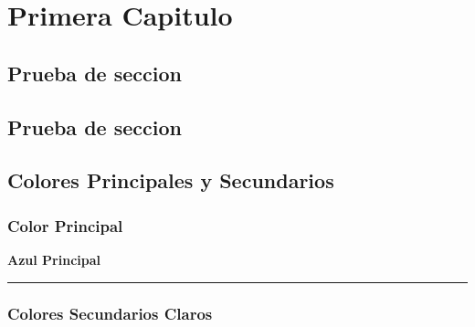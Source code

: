 \documentclass[twoside,12pt]{report}
\begin{document}



\tableofcontents   %
\thispagestyle{fancy} %
\listoffigures     %
\thispagestyle{fancy} %
\listoftables      %
\thispagestyle{fancy} %

\chapter{Primera Capitulo}
\lipsum[1-10]
\section{Prueba de seccion}
\lipsum[1-10]
\section{Prueba de seccion }
\lipsum[1-10]

\section{Colores Principales y Secundarios}

\subsection{Color Principal}
\begin{center}
    \textbf{Azul Principal} \\[1ex]
    \color[HTML]{042354} \rule{10cm}{1cm}
\end{center}

\subsection{Colores Secundarios Claros}
\end{document}
